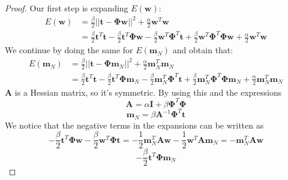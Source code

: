 \vspace{1em}

\begin{proof}
    Our first step is expanding $E(\mathbf{w})$:
    \begin{align*}
        E(\mathbf{w})
        &= \frac{\beta}{2} ||\mathbf{t} - \mathbf{\Phi}\mathbf{w}||^2 
            + \frac{\alpha}{2} \mathbf{w}^T\mathbf{w} \tag{3.79} \\
        &= \frac{\beta}{2} \mathbf{t}^T\mathbf{t} 
            - \frac{\beta}{2} \mathbf{t}^T\mathbf{\Phi}\mathbf{w} 
            - \frac{\beta}{2} \mathbf{w}^T\mathbf{\Phi}^T\mathbf{t}
            + \frac{\beta}{2} \mathbf{w}^T\mathbf{\Phi}^T\mathbf{\Phi}\mathbf{w}
            + \frac{\alpha}{2} \mathbf{w}^T\mathbf{w}
    \end{align*}
    We continue by doing the same for $E(\mathbf{m}_N)$ and obtain that:
    \begin{align*}
        E(\mathbf{m}_N)
        &= \frac{\beta}{2} ||\mathbf{t} - \mathbf{\Phi}\mathbf{m}_N||^2 
            + \frac{\alpha}{2} \mathbf{m}_N^T\mathbf{m}_N \\
        &= \frac{\beta}{2} \mathbf{t}^T\mathbf{t} 
            - \frac{\beta}{2} \mathbf{t}^T\mathbf{\Phi}\mathbf{m}_N 
            - \frac{\beta}{2} \mathbf{m}_N^T\mathbf{\Phi}^T\mathbf{t}
            + \frac{\beta}{2} \mathbf{m}_N^T\mathbf{\Phi}^T\mathbf{\Phi}\mathbf{m}_N
            + \frac{\alpha}{2} \mathbf{m}_N^T\mathbf{m}_N
    \end{align*}
    $\mathbf{A}$ is a Hessian matrix, so it's symmetric. By using this
    and the expressions
    \begin{equation}\label{eq:3.81}\tag{3.81}
        \mathbf{A} = \alpha \mathbf{I} + \beta \mathbf{\Phi}^T\mathbf{\Phi}
    \end{equation}
    \vspace{-1em}
    \begin{equation}\label{eq:3.84}\tag{3.84}
        \mathbf{m}_N = \beta \mathbf{A}^{-1} \mathbf{\Phi}^T\mathbf{t}
    \end{equation}
    We notice that the negative terms in the expansions can be written as
    \[
        -\frac{\beta}{2} \mathbf{t}^T\mathbf{\Phi}\mathbf{w}
            - \frac{\beta}{2} \mathbf{w}^T\mathbf{\Phi}\mathbf{t}
        =  
        -\frac{1}{2} \mathbf{m}_N^T\mathbf{A}\mathbf{w}
            -\frac{1}{2} \mathbf{w}^T\mathbf{A}\mathbf{m}_N
        = 
        -\mathbf{m}_N^T\mathbf{A}\mathbf{w}
    \] 
    \[
        -\frac{\beta}{2} \mathbf{t}^T\mathbf{\Phi}\mathbf{m}_N
\]
\end{proof}
